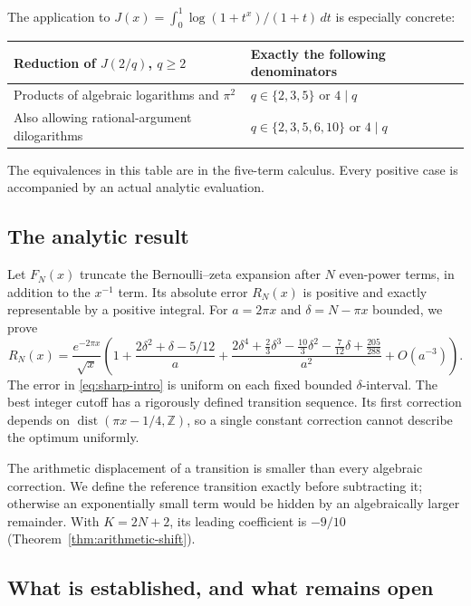 \documentclass[11pt]{article}
\numberwithin{equation}{section}
\theoremstyle{definition}
\theoremstyle{remark}
\newcommand{\Z}{\mathbb Z}
\DeclareMathOperator{\dist}{dist}
\begin{document}
The application to
$J(x)=\int_0^1\log(1+t^x)/(1+t)\,dt$ is especially concrete:
\begin{center}
\begin{tabular}{ll}
\toprule
Reduction of $J(2/q)$, $q\ge2$ & Exactly the following denominators\\
\midrule
Products of algebraic logarithms and $\pi^2$ & $q\in\{2,3,5\}$ or $4\mid q$\\
Also allowing rational-argument dilogarithms & $q\in\{2,3,5,6,10\}$ or $4\mid q$\\
\bottomrule
\end{tabular}
\end{center}
The equivalences in this table are in the five-term calculus. Every
positive case is accompanied by an actual analytic evaluation.

\subsection{The analytic result}

Let $F_N(x)$ truncate the Bernoulli--zeta expansion after $N$ even-power
terms, in addition to the $x^{-1}$ term. Its absolute error $R_N(x)$ is
positive and exactly representable by a positive integral. For
$a=2\pi x$ and $\delta=N-\pi x$ bounded, we prove
\begin{equation}\label{eq:sharp-intro}
 R_N(x)=\frac{e^{-2\pi x}}{\sqrt{x}}
 \left(1+\frac{2\delta^2+\delta-5/12}{a}
 +\frac{2\delta^4+\frac23\delta^3-\frac{10}3\delta^2
 -\frac7{12}\delta+\frac{205}{288}}{a^2}
 +O(a^{-3})\right).
\end{equation}
The error in \eqref{eq:sharp-intro} is uniform on each fixed bounded
$\delta$-interval. The best integer cutoff has a rigorously defined
transition sequence. Its first correction depends on
$\dist(\pi x-1/4,\Z)$, so a single constant correction cannot describe the
optimum uniformly.

The arithmetic displacement of a transition is smaller than every
algebraic correction. We define the reference transition exactly before
subtracting it; otherwise an exponentially small term would be hidden by
an algebraically larger remainder. With $K=2N+2$, its leading coefficient
is $-9/10$ (Theorem~\ref{thm:arithmetic-shift}).

\subsection{What is established, and what remains open}
\end{document}
